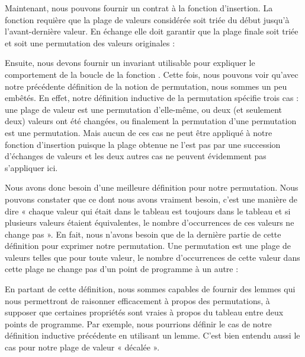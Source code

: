 


Maintenant, nous pouvons fournir un contrat à la fonction d'insertion. La
fonction requière que la plage de valeurs considérée soit triée du début jusqu'à
l'avant-dernière valeur. En échange elle doit garantir que la plage finale soit
triée et soit une permutation des valeurs originales :






Ensuite, nous devons fournir un invariant utilisable pour expliquer le comportement
de la boucle de la fonction . Cette fois, nous pouvons voir
qu'avec notre précédente définition de la notion de permutation, nous sommes un
peu embêtés. En effet, notre définition inductive de la permutation spécifie trois
cas : une plage de valeur est une permutation d'elle-même, ou deux (et seulement
deux) valeurs ont été changées, ou finalement la permutation d'une permutation est
une permutation. Mais aucun de ces cas ne peut être appliqué à notre fonction
d'insertion puisque la plage obtenue ne l'est pas par une succession d'échanges de
valeurs et les deux autres cas ne peuvent évidemment pas s'appliquer ici.



Nous avons donc besoin d'une meilleure définition pour notre permutation. Nous
pouvons constater que ce dont nous avons vraiment besoin, c'est une manière de
dire « chaque valeur qui était dans le tableau est toujours dans le tableau et
si plusieurs valeurs étaient équivalentes, le nombre d'occurrences de ces valeurs
ne change pas ». En fait, nous n'avons besoin que de la dernière partie de cette
définition pour exprimer notre permutation. Une permutation est une plage de valeurs
telles que pour toute valeur, le nombre d'occurrences de cette valeur dans cette
plage ne change pas d'un point de programme à un autre :






En partant de cette définition, nous sommes capables de fournir des lemmes qui
nous permettront de raisonner efficacement à propos des permutations, à
supposer que certaines propriétés sont vraies à propos du tableau entre deux
points de programme. Par exemple, nous pourrions définir le cas 
de notre définition inductive précédente en utilisant un lemme. C'est bien
entendu aussi le cas pour notre plage de valeur « décalée ».



